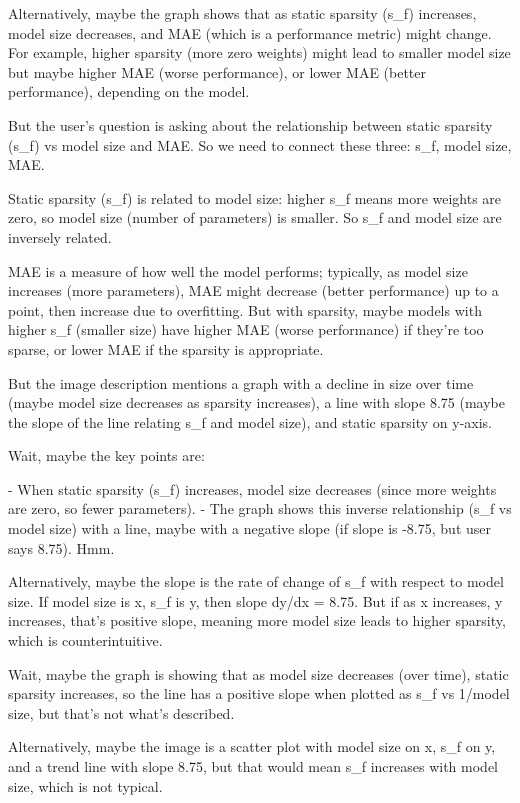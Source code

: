 Alternatively, maybe the graph shows that as static sparsity (s_f) increases, model size decreases, and MAE (which is a performance metric) might change. For example, higher sparsity (more zero weights) might lead to smaller model size but maybe higher MAE (worse performance), or lower MAE (better performance), depending on the model. 

But the user's question is asking about the relationship between static sparsity (s_f) vs model size and MAE. So we need to connect these three: s_f, model size, MAE. 

Static sparsity (s_f) is related to model size: higher s_f means more weights are zero, so model size (number of parameters) is smaller. So s_f and model size are inversely related. 

MAE is a measure of how well the model performs; typically, as model size increases (more parameters), MAE might decrease (better performance) up to a point, then increase due to overfitting. But with sparsity, maybe models with higher s_f (smaller size) have higher MAE (worse performance) if they're too sparse, or lower MAE if the sparsity is appropriate. 

But the image description mentions a graph with a decline in size over time (maybe model size decreases as sparsity increases), a line with slope 8.75 (maybe the slope of the line relating s_f and model size), and static sparsity on y-axis. 

Wait, maybe the key points are:

- When static sparsity (s_f) increases, model size decreases (since more weights are zero, so fewer parameters). 
- The graph shows this inverse relationship (s_f vs model size) with a line, maybe with a negative slope (if slope is -8.75, but user says 8.75). Hmm. 

Alternatively, maybe the slope is the rate of change of s_f with respect to model size. If model size is x, s_f is y, then slope dy/dx = 8.75. But if as x increases, y increases, that's positive slope, meaning more model size leads to higher sparsity, which is counterintuitive. 

Wait, maybe the graph is showing that as model size decreases (over time), static sparsity increases, so the line has a positive slope when plotted as s_f vs 1/model size, but that's not what's described. 

Alternatively, maybe the image is a scatter plot with model size on x, s_f on y, and a trend line with slope 8.75, but that would mean s_f increases with model size, which is not typical. 


